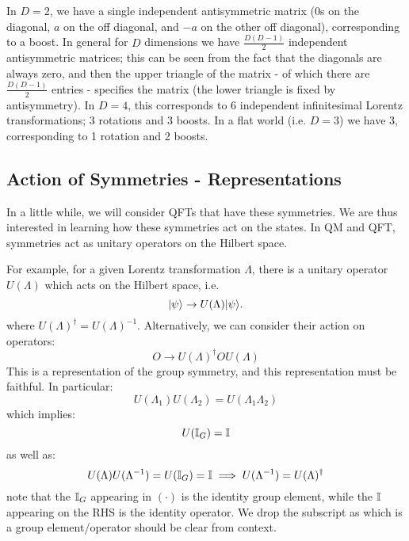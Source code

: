 In $D = 2$, we have a single independent antisymmetric matrix (0s on the diagonal, $a$ on the off diagonal, and $-a$ on the other off diagonal), corresponding to a boost. In general for $D$ dimensions we have $\frac{D(D-1)}{2}$ independent antisymmetric matrices; this can be seen from the fact that the diagonals are always zero, and then the upper triangle of the matrix - of which there are $\frac{D(D-1)}{2}$ entries - specifies the matrix (the lower triangle is fixed by antisymmetry). In $D = 4$, this corresponds to 6 independent infinitesimal Lorentz transformations; 3 rotations and 3 boosts. In a flat world (i.e. $D = 3$) we have 3, corresponding to 1 rotation and 2 boosts.

\subsection{Action of Symmetries - Representations}
In a little while, we will consider QFTs that have these symmetries. We are thus interested in learning how these symmetries act on the states. In QM and QFT, symmetries act as unitary operators on the Hilbert space.

For example, for a given Lorentz transformation $\Lambda$, there is a unitary operator $U(\Lambda)$ which acts on the Hilbert space, i.e.
\begin{equation}
    \lvert \psi \rangle \to U(\Lambda)\lvert \psi \rangle.
\end{equation}
where $U(\Lambda)^\dagger = U(\Lambda)^{-1}$. Alternatively, we can consider their action on operators:
\begin{equation}
    O \to U(\Lambda)^\dagger O U(\Lambda)
\end{equation}
This is a representation of the group symmetry, and this representation must be faithful. In particular:
\begin{equation}
    U(\Lambda_1)U(\Lambda_2) = U(\Lambda_1\Lambda_2)
\end{equation}
which implies:
\begin{equation}
    U(\mathbb{I}_G) = \mathbb{I}
\end{equation}
as well as:
\begin{equation}
    U(\Lambda)U(\Lambda^{-1}) = U(\mathbb{I}_G) = \mathbb{I} \implies U(\Lambda^{-1}) = U(\Lambda)^\dagger
\end{equation}
note that the $\mathbb{I}_G$ appearing in $(\cdot)$ is the identity group element, while the $\mathbb{I}$ appearing on the RHS is the identity operator. We drop the subscript as which is a group element/operator should be clear from context.

